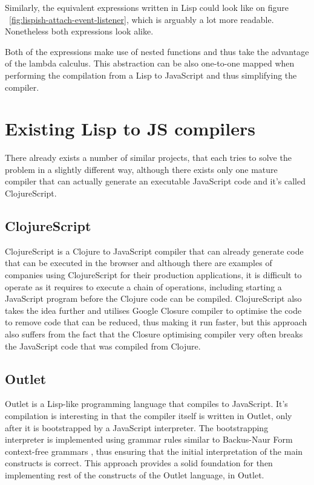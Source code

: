 

Similarly, the equivalent expressions written in Lisp could look like on figure ~\ref{fig:lispish-attach-event-listener}, which is arguably a lot more readable. Nonetheless both expressions look alike. 

Both of the expressions make use of nested functions and thus take the advantage of the lambda calculus. This abstraction can be also one-to-one mapped when performing the compilation from a Lisp to JavaScript and thus simplifying the compiler.

\section{Existing Lisp to JS compilers}
There already exists a number of similar projects, that each tries to solve the problem in a slightly different way, although there exists only one mature compiler that can actually generate an executable JavaScript code and it's called ClojureScript.

\subsection{ClojureScript}
ClojureScript is a Clojure to JavaScript compiler that can already generate code that can be executed in the browser and although there are examples of companies using ClojureScript for their production applications, it is difficult to operate as it requires to execute a chain of operations, including starting a JavaScript program before the Clojure code can be compiled.
ClojureScript also takes the idea further and utilises Google Closure compiler to optimise the code to remove code that can be reduced, thus making it run faster, but this approach also suffers from the fact that the Closure optimising compiler very often breaks the JavaScript code that was compiled from Clojure.

\subsection{Outlet}
Outlet\cite{Outlet:2013:Site} is a Lisp-like programming language that compiles to JavaScript. 
It's compilation is interesting in that the compiler itself is written in Outlet, only after it is bootstrapped by a JavaScript interpreter.
The bootstrapping interpreter is implemented using grammar rules similar to Backus-Naur Form context-free grammars \cite{RecursiveDescentParserJS:2013:Site} , thus ensuring that the initial interpretation of the main constructs is correct. 
This approach provides a solid foundation for then implementing rest of the constructs of the Outlet language, in Outlet.

